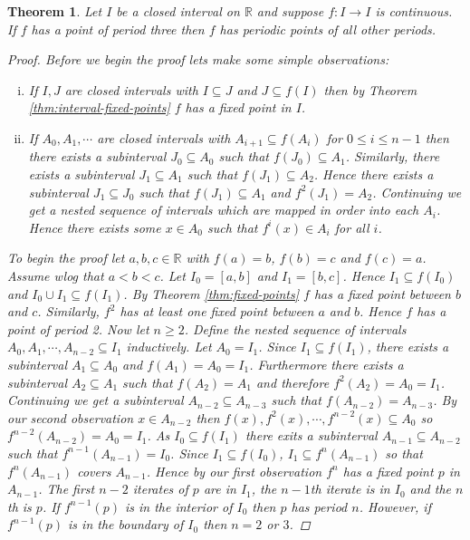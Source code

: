 \documentclass[11pt,a4paper,oneside]{memoir}
\theoremstyle{plain}
\newtheorem{thm}{Theorem}[chapter]
\theoremstyle{definition}
\begin{document}
\begin{thm}\label{thm:period3chaos}
    Let $I$ be a closed interval on $\mathbb{R}$ and suppose $f: I \to I$ is continuous. If $f$ has a point of period three then $f$ has periodic points of all other periods.
    \begin{proof}
        Before we begin the proof lets make some simple observations:
        \begin{enumerate}[(i)]
            \item If $I, J$ are closed intervals with $I \subseteq J$ and $J \subseteq f(I)$ then by Theorem \ref{thm:interval-fixed-points} $f$ has a fixed point in $I$.
            \item If $A_0, A_1, \cdots$ are closed intervals with $A_{i+1} \subseteq f(A_i)$ for $0 \leq i \leq n - 1$ then there exists a subinterval $J_0 \subseteq A_0$ such that $f(J_0) \subseteq A_1$. Similarly, there exists a subinterval $J_1 \subseteq A_1$ such that $f(J_1) \subseteq A_2$. Hence there exists a subinterval $J_1 \subseteq J_0$ such that $f(J_1) \subseteq A_1$ and $f^2(J_1) = A_2$. Continuing we get a nested sequence of intervals which are mapped in order into each $A_i$. Hence there exists some $x \in A_0$ such that $f^i(x) \in A_i$ for all $i$.
        \end{enumerate}
        To begin the proof let $a, b, c \in \mathbb{R}$ with $f(a) = b$, $f(b) = c$ and $f(c) = a$. Assume wlog that $a < b < c$. Let $I_0 = [a,b]$ and $I_1 = [b,c]$. Hence $I_1 \subseteq f(I_0)$ and $I_0 \cup I_1 \subseteq f(I_1)$. By Theorem \ref{thm:fixed-points} $f$ has a fixed point between $b$ and $c$. Similarly, $f^2$ has at least one fixed point between $a$ and $b$. Hence $f$ has a point of period 2. Now let $n \geq 2$. Define the nested sequence of intervals $A_0, A_1, \cdots, A_{n-2} \subseteq I_1$ inductively. Let $A_0 = I_1$. Since $I_1 \subseteq f(I_1)$, there exists a subinterval $A_1 \subseteq A_0$ and $f(A_1) = A_0 = I_1$. Furthermore there exists a subinterval $A_2 \subseteq A_1$ such that $f(A_2) = A_1$ and therefore $f^2(A_2) = A_0 = I_1$. Continuing we get a subinterval $A_{n-2} \subseteq A_{n-3}$ such that $f(A_{n-2}) = A_{n-3}$. By our second observation $x \in A_{n-2}$ then $f(x), f^2(x), \cdots, f^{n-2}(x) \subseteq A_0$ so $f^{n-2}(A_{n-2}) = A_0 = I_1$. As $I_0 \subseteq f(I_1)$ there exits a subinterval $A_{n-1} \subseteq A_{n-2}$ such that $f^{n-1}(A_{n-1}) = I_0$. Since $I_1 \subseteq f(I_0)$, $I_1 \subseteq f^n(A_{n-1})$ so that $f^n(A_{n-1})$ covers $A_{n-1}$. Hence by our first observation $f^n$ has a fixed point $p$ in $A_{n-1}$. The first $n-2$ iterates of $p$ are in $I_1$, the $n-1$th iterate is in $I_0$ and the $n$th is $p$. If $f^{n-1}(p)$ is in the interior of $I_0$ then $p$ has period $n$. However, if $f^{n-1}(p)$ is in the boundary of $I_0$ then $n = 2$ or $3$.
    \end{proof}
\end{thm}
\end{document}
